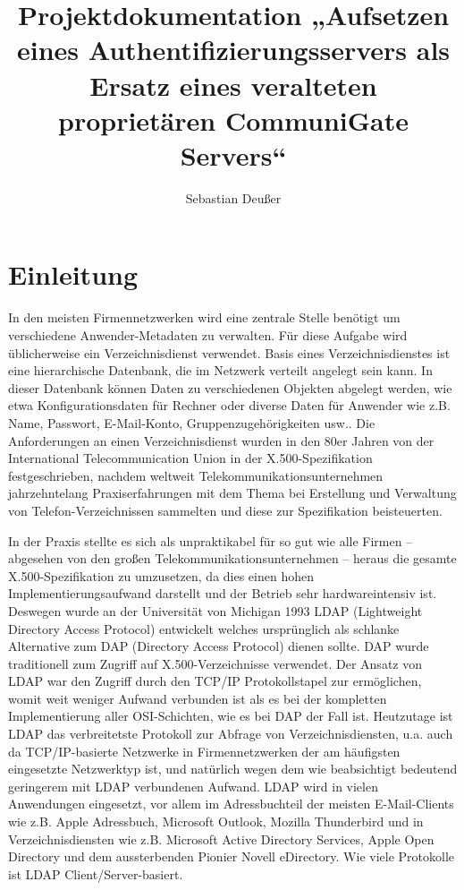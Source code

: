 \documentclass[11pt,a4paper,titlepage=firstiscover,headsepline,bibtotoc]{scrartcl} %
\title{Projektdokumentation „Aufsetzen eines Authentifizierungsservers als Ersatz eines veralteten proprietären CommuniGate Servers“}
\author{Sebastian Deußer}
\begin{document}
\pagestyle{empty}


\tableofcontents
\newpage
\setcounter{page}{1}  %
\pagestyle{scrheadings}

\section{Einleitung}
In den meisten Firmennetzwerken wird eine zentrale Stelle benötigt um verschiedene Anwender-Metadaten zu verwalten. Für diese Aufgabe wird üblicherweise ein Verzeichnisdienst verwendet. Basis eines Verzeichnisdienstes ist eine hierarchische Datenbank, die im Netzwerk verteilt angelegt sein kann. In dieser Datenbank können Daten zu verschiedenen Objekten abgelegt werden, wie etwa Konfigurationsdaten für Rechner oder diverse Daten für Anwender wie z.B. Name, Passwort, E-Mail-Konto, Gruppenzugehörigkeiten usw.. Die Anforderungen an einen Verzeichnisdienst wurden in den 80er Jahren von der International Telecommunication Union in der X.500-Spezifikation festgeschrieben, nachdem weltweit Telekommunikationsunternehmen jahrzehntelang Praxiserfahrungen mit dem Thema bei Erstellung und Verwaltung von Telefon-Verzeichnissen sammelten und diese zur Spezifikation beisteuerten.

In der Praxis stellte es sich als unpraktikabel für so gut wie alle Firmen -- abgesehen von den großen Telekommunikationsunternehmen -- heraus die gesamte X.500-Spezifikation zu umzusetzen, da dies einen hohen Implementierungsaufwand darstellt und der Betrieb sehr hardwareintensiv ist. Deswegen wurde an der Universität von Michigan 1993 LDAP (Lightweight Directory Access Protocol) entwickelt welches ursprünglich als schlanke Alternative zum DAP (Directory Access Protocol) dienen sollte. DAP wurde traditionell zum Zugriff auf X.500-Verzeichnisse verwendet. Der Ansatz von LDAP war den Zugriff durch den TCP/IP Protokollstapel zur ermöglichen, womit weit weniger Aufwand verbunden ist als es bei der kompletten Implementierung aller OSI-Schichten, wie es bei DAP der Fall ist. Heutzutage ist LDAP das verbreitetste Protokoll zur Abfrage von Verzeichnisdiensten, u.a. auch da TCP/IP-basierte Netzwerke in Firmennetzwerken der am häufigsten eingesetzte Netzwerktyp ist, und natürlich wegen dem wie beabsichtigt bedeutend geringerem mit LDAP verbundenen Aufwand. LDAP wird in vielen Anwendungen eingesetzt, vor allem im Adressbuchteil der meisten E-Mail-Clients wie z.B. Apple Adressbuch, Microsoft Outlook, Mozilla Thunderbird und in Verzeichnisdiensten wie z.B. Microsoft Active Directory Services, Apple Open Directory und dem aussterbenden Pionier Novell eDirectory. Wie viele Protokolle ist LDAP Client/Server-basiert.
\end{document}
